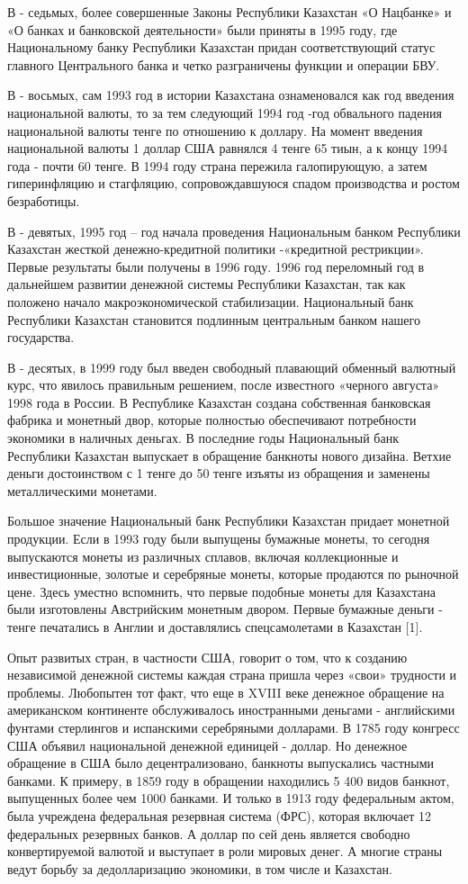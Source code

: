 В - седьмых, более совершенные Законы Республики Казахстан «О Нацбанке»
и «О банках и банковской деятельности» были приняты в 1995 году, где
Национальному банку Республики Казахстан придан соответствующий статус
главного Центрального банка и четко разграничены функции и операции БВУ.

В - восьмых, сам 1993 год в истории Казахстана ознаменовался как год
введения национальной валюты, то за тем следующий 1994 год -год
обвального падения национальной валюты тенге по отношению к доллару. На
момент введения национальной валюты 1 доллар США равнялся 4 тенге 65
тиын, а к концу 1994 года - почти 60 тенге. В 1994 году страна пережила
галопирующую, а затем гиперинфляцию и стагфляцию, сопровождавшуюся
спадом производства и ростом безработицы.

В - девятых, 1995 год -- год начала проведения Национальным банком
Республики Казахстан жесткой денежно-кредитной политики -«кредитной
рестрикции». Первые результаты были получены в 1996 году. 1996 год
переломный год в дальнейшем развитии денежной системы Республики
Казахстан, так как положено начало макроэкономической стабилизации.
Национальный банк Республики Казахстан становится подлинным центральным
банком нашего государства.

В - десятых, в 1999 году был введен свободный плавающий обменный
валютный курс, что явилось правильным решением, после известного
«черного августа» 1998 года в России. В Республике Казахстан создана
собственная банковская фабрика и монетный двор, которые полностью
обеспечивают потребности экономики в наличных деньгах. В последние годы
Национальный банк Республики Казахстан выпускает в обращение банкноты
нового дизайна. Ветхие деньги достоинством с 1 тенге до 50 тенге изъяты
из обращения и заменены металлическими монетами.

Большое значение Национальный банк Республики Казахстан придает монетной
продукции. Если в 1993 году были выпущены бумажные монеты, то сегодня
выпускаются монеты из различных сплавов, включая коллекционные и
инвестиционные, золотые и серебряные монеты, которые продаются по
рыночной цене\emph{.} Здесь уместно вспомнить, что первые подобные
монеты для Казахстана были изготовлены Австрийским монетным двором.
Первые бумажные деньги - тенге печатались в Англии и доставлялись
спецсамолетами в Казахстан {[}1{]}.

Опыт развитых стран, в частности США, говорит о том, что к созданию
независимой денежной системы каждая страна пришла через «свои» трудности
и проблемы. Любопытен тот факт, что еще в XVIII веке денежное обращение
на американском континенте обслуживалось иностранными деньгами -
английскими фунтами стерлингов и испанскими серебряными долларами. В
1785 году конгресс США объявил национальной денежной единицей - доллар.
Но денежное обращение в США было децентрализовано, банкноты выпускались
частными банками. К примеру, в 1859 году в обращении находились 5 400
видов банкнот, выпущенных более чем 1000 банками. И только в 1913 году
федеральным актом, была учреждена федеральная резервная система (ФРС),
которая включает 12 федеральных резервных банков. А доллар по сей день
является свободно конвертируемой валютой и выступает в роли мировых
денег. А многие страны ведут борьбу за дедолларизацию экономики, в том
числе и Казахстан.

